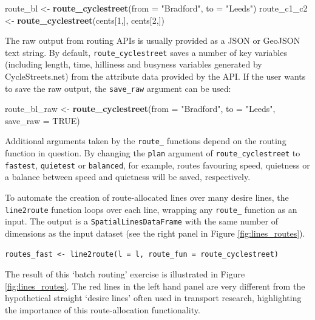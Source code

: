 \documentclass[11pt]{article}
\newenvironment{Shaded}{\begin{snugshade}}{\end{snugshade}}
\newcommand{\KeywordTok}[1]{\textcolor[rgb]{0.13,0.29,0.53}{\textbf{{#1}}}}
\newcommand{\DataTypeTok}[1]{\textcolor[rgb]{0.13,0.29,0.53}{{#1}}}
\newcommand{\DecValTok}[1]{\textcolor[rgb]{0.00,0.00,0.81}{{#1}}}
\newcommand{\StringTok}[1]{\textcolor[rgb]{0.31,0.60,0.02}{{#1}}}
\newcommand{\OtherTok}[1]{\textcolor[rgb]{0.56,0.35,0.01}{{#1}}}
\newcommand{\NormalTok}[1]{{#1}}
\begin{document}
\begin{Shaded}
\begin{Highlighting}[]
\NormalTok{route_bl <-}\StringTok{ }\KeywordTok{route_cyclestreet}\NormalTok{(}\DataTypeTok{from =} \StringTok{"Bradford"}\NormalTok{, }\DataTypeTok{to =} \StringTok{"Leeds"}\NormalTok{)}
\NormalTok{route_c1_c2 <-}\StringTok{ }\KeywordTok{route_cyclestreet}\NormalTok{(cents[}\DecValTok{1}\NormalTok{,], cents[}\DecValTok{2}\NormalTok{,])}
\end{Highlighting}
\end{Shaded}

The raw output from routing APIs is usually provided as a JSON or
GeoJSON text string. By default, \texttt{route\_cyclestreet} saves a
number of key variables (including length, time, hilliness and busyness
variables generated by CycleStreets.net) from the attribute data
provided by the API. If the user wants to save the raw output, the
\texttt{save\_raw} argument can be used:

\begin{Shaded}
\begin{Highlighting}[]
\NormalTok{route_bl_raw <-}\StringTok{ }\KeywordTok{route_cyclestreet}\NormalTok{(}\DataTypeTok{from =} \StringTok{"Bradford"}\NormalTok{, }\DataTypeTok{to =} \StringTok{"Leeds"}\NormalTok{, }\DataTypeTok{save_raw =} \OtherTok{TRUE}\NormalTok{)}
\end{Highlighting}
\end{Shaded}

Additional arguments taken by the \texttt{route\_} functions depend on
the routing function in question. By changing the \texttt{plan} argument
of \texttt{route\_cyclestreet} to \texttt{fastest}, \texttt{quietest} or
\texttt{balanced}, for example, routes favouring speed, quietness or a
balance between speed and quietness will be saved, respectively.

To automate the creation of route-allocated lines over many desire
lines, the \texttt{line2route} function loops over each line, wrapping
any \texttt{route\_} function as an input. The output is a
\texttt{SpatialLinesDataFrame} with the same number of dimensions as the
input dataset (see the right panel in Figure \ref{fig:lines_routes}).

\begin{verbatim}
routes_fast <- line2route(l = l, route_fun = route_cyclestreet)
\end{verbatim}

The result of this `batch routing' exercise is illustrated in Figure
\ref{fig:lines_routes}. The red lines in the left hand panel are very
different from the hypothetical straight `desire lines' often used in
transport research, highlighting the importance of this route-allocation
functionality.
\end{document}
